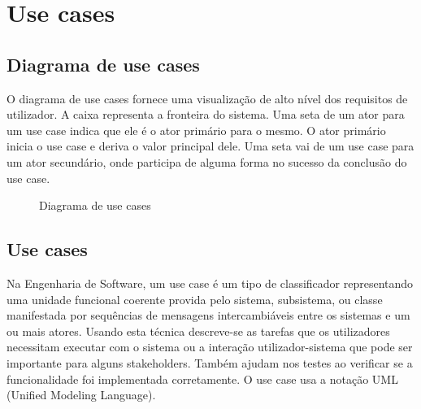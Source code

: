\documentclass{scrreprt}
\begin{document}
\chapter{Use cases}

\section{Diagrama de use cases}

O diagrama de use cases fornece uma visualização de alto nível dos requisitos de utilizador. A caixa representa a fronteira do sistema. Uma seta de um ator para um use case indica que ele é o ator primário para o mesmo.
\newline
O ator primário inicia o use case e deriva o valor principal dele. Uma seta vai de um use case para um ator secundário, onde participa de alguma forma no sucesso da conclusão do use case.
\begin{figure}[H]
    \centering
    \caption{Diagrama de use cases}
    \label{fig:diagrama use cases}
\end{figure}

\section{Use cases}

Na Engenharia de Software, um use case é um tipo de classificador representando uma unidade funcional coerente provida pelo sistema, subsistema, ou classe manifestada por sequências de mensagens intercambiáveis entre os sistemas e um ou mais atores.
\newline
Usando esta técnica descreve-se as tarefas que os utilizadores necessitam executar com o sistema ou a interação utilizador-sistema que pode ser importante para alguns stakeholders. Também ajudam nos testes ao verificar se a funcionalidade foi implementada corretamente. O use case usa a notação UML (Unified Modeling Language).
\end{document}
